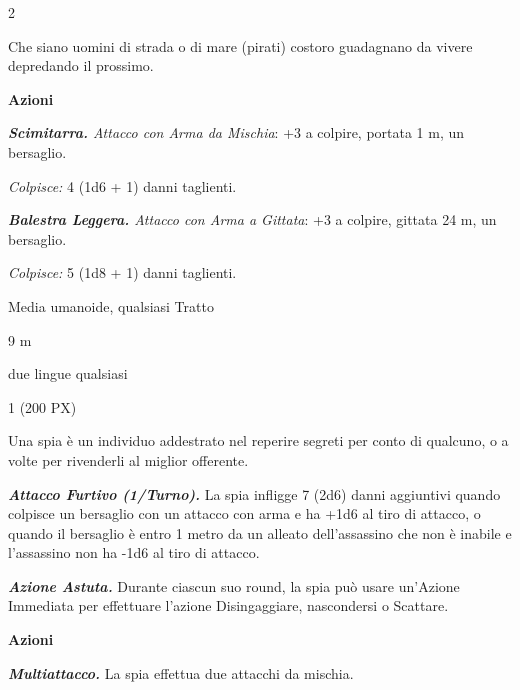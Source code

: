 \begin{multicols}{2}
{Che siano uomini di strada o di mare (pirati) costoro guadagnano da vivere depredando il prossimo.

\textbf{Azioni}

\emph{\textbf{Scimitarra.} Attacco con Arma da Mischia}: +3 a colpire, portata 1 m, un bersaglio.

\emph{Colpisce:} 4 (1d6 + 1) danni taglienti.

\emph{\textbf{Balestra Leggera.} Attacco con Arma a Gittata}: +3 a colpire, gittata 24 m, un bersaglio.

\emph{Colpisce:} 5 (1d8 + 1) danni taglienti.

\begin{description}[noitemsep, topsep=0pt, parsep=0pt, partopsep=0pt, itemsep=1pt, leftmargin=2.35cm,  labelwidth=2.2cm, itemindent=0cm, listparindent=0pt] %
\setlength{\baselineskip}{10pt}
\item[\textbf{Taglia/Tipo}] Media umanoide, qualsiasi Tratto
\item[\textbf{Caratt.}] 
\item[\textbf{Punti Ferita}] 
\item[\textbf{Tiri Salvez.}] 
\item[\textbf{Movimento}] 9 m
\item[\textbf{Linguaggi}] due lingue qualsiasi
\item[\textbf{Sfida}] 1 (200 PX)
\end{description}
\smallskip

Una spia è un individuo addestrato nel reperire segreti per conto di qualcuno, o a volte per rivenderli al miglior offerente.

\emph{\textbf{Attacco Furtivo (1/Turno).}} La spia infligge 7 (2d6) danni aggiuntivi quando colpisce un bersaglio con un attacco con arma e ha +1d6 al tiro di attacco, o quando il bersaglio è entro 1 metro da un alleato dell'assassino che non è inabile e l'assassino non ha -1d6 al tiro di attacco.

\emph{\textbf{Azione Astuta.}} Durante ciascun suo round, la spia può usare un'Azione Immediata per effettuare l'azione Disingaggiare, nascondersi o Scattare.

\textbf{Azioni}

\emph{\textbf{Multiattacco.}} La spia effettua due attacchi da mischia.

}
\end{multicols}
